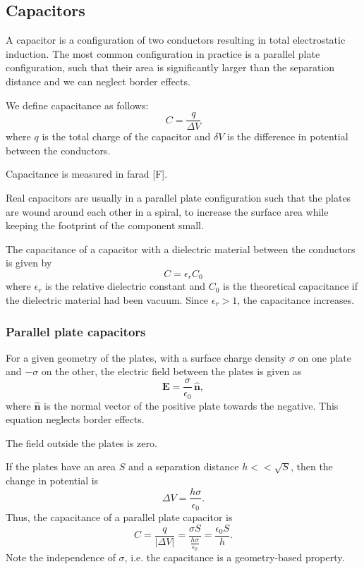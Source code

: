 \documentclass[a4paper, 12pt]{article}
\renewcommand{\vec}[1]{\mathbf{#1}}
\newcommand{\E}{\ensuremath{\vec{E}}}
\newcommand{\e}{\ensuremath{\epsilon_0}}
\let\tmp\hat
\renewcommand{\hat}[1]{\vec{\tmp{#1}}}
\begin{document}
    \subsection{Capacitors}
    A capacitor is a configuration of two conductors resulting in total electrostatic induction. 
    The most common configuration in practice is a parallel plate configuration, 
    such that their area is significantly larger than the separation distance and we can neglect border effects.
    
    We define capacitance as follows:
    \begin{equation}
        C = \frac{q}{\Delta V}
    \end{equation}
    where $q$ is the total charge of the capacitor and $\delta V$ is the difference in potential between the conductors.
    
    Capacitance is measured in farad [F].
    
    Real capacitors are usually in a parallel plate configuration such that the plates are wound around each other in a spiral, 
    to increase the surface area while keeping the footprint of the component small.
    
    The capacitance of a capacitor with a dielectric material between the conductors is given by
    \begin{equation}
        C = \epsilon_rC_0
    \end{equation}
    where $\epsilon_r$ is the relative dielectric constant and $C_0$ is the theoretical capacitance 
    if the dielectric material had been vacuum. Since $\epsilon_r > 1$, the capacitance increases.
    
    \subsubsection{Parallel plate capacitors}
        For a given geometry of the plates, with a surface charge density $\sigma$ on one plate and $-\sigma$ on the other, 
        the electric field between the plates is given as 
        \begin{equation}
            \E = \frac{\sigma}{\e}\,\hat{n},
        \end{equation}
        where $\hat{n}$ is the normal vector of the positive plate towards the negative. This equation neglects border effects.
        
        The field outside the plates is zero.
        
        If the plates have an area $S$ and a separation distance $h << \sqrt{S}$, then the change in potential is
        \begin{equation}
            \Delta V = \frac{h\sigma}{\e}.
        \end{equation}
        Thus, the capacitance of a parallel plate capacitor is
        \begin{equation}
            C = \frac{q}{|\Delta V|} = \frac{\sigma S}{\frac{h\sigma}{\e}} = \frac{\e S}{h}.
        \end{equation}
        Note the independence of $\sigma$, i.e. the capacitance is a geometry-based property.
\end{document}
